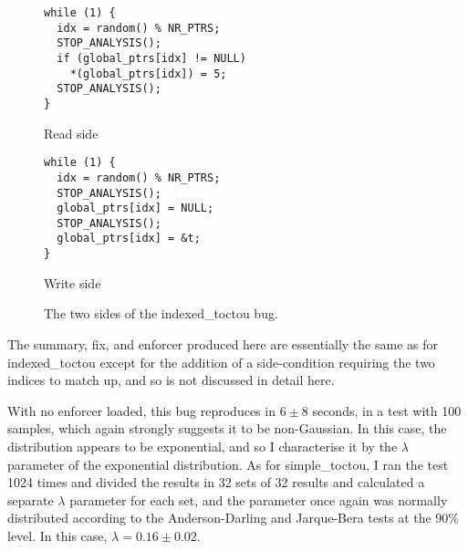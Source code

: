 \begin{figure}
  \begin{subfloat}
    \begin{minipage}{50mm}
\begin{verbatim}
while (1) {
  idx = random() % NR_PTRS;
  STOP_ANALYSIS();
  if (global_ptrs[idx] != NULL)
    *(global_ptrs[idx]) = 5;
  STOP_ANALYSIS();
}
\end{verbatim}
    \end{minipage}
    \caption{Read side}
  \end{subfloat}
  \begin{subfloat}
    \begin{minipage}{50mm}
\begin{verbatim}
while (1) {
  idx = random() % NR_PTRS;
  STOP_ANALYSIS();
  global_ptrs[idx] = NULL;
  STOP_ANALYSIS();
  global_ptrs[idx] = &t;
}
\end{verbatim}
    \end{minipage}
    \caption{Write side}
  \end{subfloat}
  \caption{The two sides of the indexed\_toctou bug.}
  \label{fig:eval:indexed_toctou}
\end{figure}

The summary, fix, and enforcer produced here are essentially the same
as for indexed\_toctou except for the addition of a side-condition
requiring the two indices to match up, and so is not discussed in
detail here.

With no enforcer loaded, this bug reproduces in $6 \pm 8$ seconds, in
a test with 100 samples, which again strongly suggests it to be
non-Gaussian.  In this case, the distribution appears to be
exponential, and so I characterise it by the $\lambda$ parameter of
the exponential distribution.  As for simple\_toctou, I ran the test
1024 times and divided the results in 32 sets of 32 results and
calculated a separate $\lambda$ parameter for each set, and the
parameter once again was normally distributed according to the
Anderson-Darling and Jarque-Bera tests at the 90\% level.  In this
case, $\lambda = 0.16 \pm 0.02$.

  


